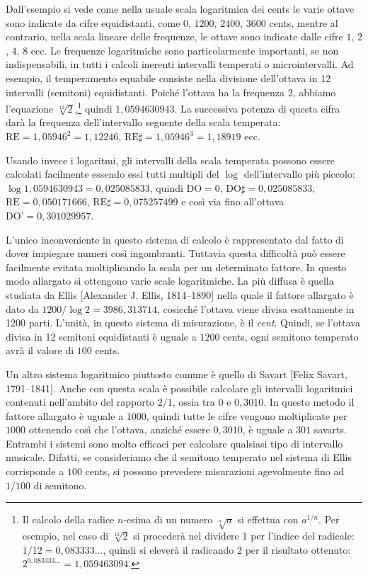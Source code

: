 Dall'esempio si vede come nella usuale scala logaritmica dei cents le varie
ottave sono indicate da cifre equidistanti, come $0$, $1200$, $2400$, $3600$
cents, mentre al contrario, nella scala lineare delle frequenze, le ottave sono
indicate dalle cifre $1$, $2$, $4$, $8$ ecc. Le frequenze logaritmiche sono
particolarmente importanti, se non indispensabili, in tutti i calcoli inerenti
intervalli temperati o microintervalli. Ad esempio, il temperamento equabile
consiste nella divisione dell'ottava in 12 intervalli (semitoni) equidistanti.
Poiché l'ottava ha la frequenza 2, abbiamo l'equazione
$\sqrt[12]{2}$,\footnote{Il calcolo della radice $n$-esima di un numero
$\sqrt[n]{a}$ si effettua con $a^{1/n}$. Per esempio, nel caso di
$\sqrt[12]{2}$ si procederà nel dividere 1 per l'indice del radicale:
$1/12 = 0{,}083333\ldots$, quindi si eleverà il radicando 2 per il risultato
ottenuto: $2^{0{,}083333\ldots} = 1{,}059463094$.} quindi $1{,}0594630943$. La
successiva potenza di questa cifra darà la frequenza dell'intervallo seguente
della scala temperata: $\text{RE} = 1{,}05946^{2} = 1{,}12246$,
$\text{RE}\sharp = 1{,}05946^{3} = 1{,}18919$ ecc.

Usando invece i logaritmi, gli intervalli della scala temperata possono essere
calcolati facilmente essendo essi tutti multipli del $\log$ dell'intervallo più
piccolo: $\log 1{,}0594630943 = 0{,}025085833$, quindi $\text{DO} = 0$,
$\text{DO}\sharp = 0{,}025085833$, $\text{RE} = 0{,}050171666$,
$\text{RE}\sharp = 0{,}075257499$ e così via fino all'ottava
$\text{DO'} = 0{,}301029957$.

L'unico inconveniente in questo sistema di calcolo è rappresentato dal fatto di
dover impiegare numeri così ingombranti. Tuttavia questa difficoltà può essere
facilmente evitata moltiplicando la scala per un determinato fattore. In questo
modo allargato si ottengono varie scale logaritmiche. La più diffusa è quella
studiata da Ellis [Alexander J. Ellis, 1814--1890] nella quale il fattore
allargato è dato da $1200/\!\log 2 = 3986{,}313714$, cosicché l'ottava viene
divisa esattamente in 1200 parti. L'unità, in questo sistema di misurazione, è
il \emph{cent}. Quindi, se l'ottava divisa in 12 semitoni equidistanti è uguale
a $1200$ cents, ogni semitono temperato avrà il valore di $100$ cents.

Un altro sistema logaritmico piuttosto comune è quello di Savart [Felix Savart,
1791--1841]. Anche con questa scala è possibile calcolare gli intervalli
logaritmici contenuti nell'ambito del rapporto $2/1$, ossia tra $0$ e $0{,}3010$.
In questo metodo il fattore allargato è uguale a $1000$, quindi tutte le cifre
vengono moltiplicate per $1000$ ottenendo così che l'ottava, anziché essere
$0{,}3010$, è uguale a $301$ savarts. Entrambi i sistemi sono molto efficaci per
calcolare qualsiasi tipo di intervallo musicale. Difatti, se consideriamo che il
semitono temperato nel sistema di Ellis corrisponde a $100$ cents, si possono
prevedere misurazioni agevolmente fino ad $1/100$ di semitono.

